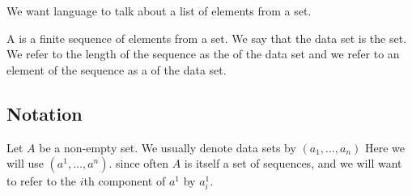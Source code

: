 

We want language to talk about
a list of elements from a set.


A  is a finite
sequence of elements from a set.
We say that the data set is
the set.
We refer to the length of
the sequence as the
 of the data set
and we refer to an element
of the sequence as a 
of the data set.

\subsection{Notation}

Let $A$ be a non-empty set.
We usually denote data sets
by $(a_1, \dots, a_n)$
Here we will use
$(a^1, \dots, a^n)$.
since often $A$ is itself
a set of sequences,
and we will want to refer
to the $i$th component of
$a^1$ by $a^1_i$.


